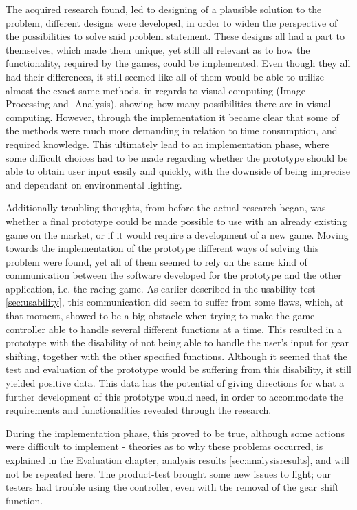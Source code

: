 The acquired research found, led to designing of a plausible solution to the problem, different designs were developed, in order to widen the perspective of the possibilities to solve said problem statement. These designs all had a part to themselves, which made them unique, yet still all relevant as to how the functionality, required by the games, could be implemented. Even though they all had their differences, it still seemed like all of them would be able to utilize almost the exact same methods, in regards to visual computing (Image Processing and -Analysis), showing how many possibilities there are in visual computing. However, through the implementation it became clear that some of the methods were much more demanding in relation to time consumption, and required knowledge. This ultimately lead to an implementation phase, where some difficult choices had to be made regarding whether the prototype should be able to obtain user input easily and quickly, with the downside of being imprecise and dependant on environmental lighting.
\bigskip

Additionally troubling thoughts, from before the actual research began, was whether a final prototype could be made possible to use with an already existing game on the market, or if it would require a development of a new game. Moving towards the implementation of the prototype different ways of solving this problem were found, yet all of them seemed to rely on the same kind of communication between the software developed for the prototype and the other application, i.e. the racing game. As earlier described in the usability test \ref{sec:usability}, this communication did seem to suffer from some flaws, which, at that moment, showed to be a big obstacle when trying to make the game controller able to handle several different functions at a time. This resulted in a prototype with the disability of not being able to handle the user’s input for gear shifting, together with the other specified functions. Although it seemed that the test and evaluation of the prototype would be suffering from this disability, it still yielded positive data. This data has the potential of giving directions for what a further development of this prototype would need, in order to accommodate the requirements and functionalities revealed through the research.
\bigskip

During the implementation phase, this proved to be true, although some actions were difficult to implement - theories as to why these problems occurred, is explained in the Evaluation chapter, analysis results \ref{sec:analysisresults}, and will not be repeated here. The product-test brought some new issues to light; our testers had trouble using the controller, even with the removal of the gear shift function. 

